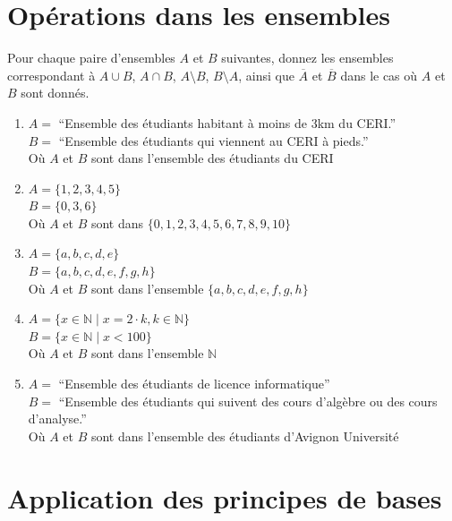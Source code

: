 \documentclass[a4paper,11pt]{article}
\begin{document}
\section{Opérations dans les ensembles}

Pour chaque paire d'ensembles $A$ et $B$ suivantes, donnez les ensembles correspondant à $A \cup B$, $A \cap B$, $A \setminus B$, $B \setminus A$, ainsi que $\overline{A}$ et $\overline{B}$ dans le cas où $A$ et $B$ sont donnés.

\begin{enumerate}
\item $A = $ ``Ensemble des étudiants habitant à moins de 3km du CERI.''\\
$B = $ ``Ensemble des étudiants qui viennent au CERI à pieds.''\\
Où $A$ et $B$ sont dans l'ensemble des étudiants du CERI

\item $A = \{1, 2, 3, 4, 5\}$\\
$B = \{0, 3, 6\}$\\
Où $A$ et $B$ sont dans $\{0, 1, 2, 3, 4, 5, 6, 7, 8, 9, 10\}$

\item $A = \{a, b, c, d, e\}$\\
$B = \{a, b, c, d, e, f, g, h\}$\\
Où $A$ et $B$ sont dans l'ensemble $\{a, b, c, d, e, f, g, h\}$

\item $A = \{x \in \mathbb{N} \mid x = 2 \cdot k, k \in \mathbb{N}\}$\\
$B = \{x \in \mathbb{N} \mid x < 100\}$\\
Où $A$ et $B$ sont dans l'ensemble $\mathbb{N}$

\item $A = $ ``Ensemble des étudiants de licence informatique''\\
$B = $ ``Ensemble des étudiants qui suivent des cours d'algèbre ou des cours d'analyse.''\\
Où $A$ et $B$ sont dans l'ensemble des étudiants d'Avignon Université
\end{enumerate}

\section{Application des principes de bases}
\end{document}
